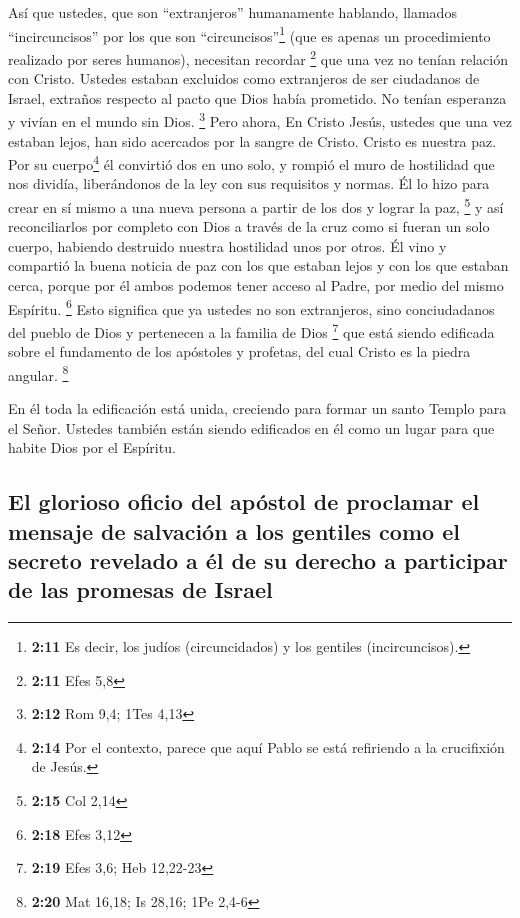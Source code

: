  Así que ustedes, que son ``extranjeros'' humanamente
hablando, llamados ``incircuncisos'' por los que son
``circuncisos''\footnote{\textbf{2:11} Es decir, los judíos
  (circuncidados) y los gentiles (incircuncisos).} (que es apenas un
procedimiento realizado por seres humanos), necesitan recordar
\footnote{\textbf{2:11} Efes 5,8}  que una vez no tenían
relación con Cristo. Ustedes estaban excluidos como extranjeros de ser
ciudadanos de Israel, extraños respecto al pacto que Dios había
prometido. No tenían esperanza y vivían en el mundo sin Dios.
\footnote{\textbf{2:12} Rom 9,4; 1Tes 4,13}  Pero ahora,
En Cristo Jesús, ustedes que una vez estaban lejos, han sido acercados
por la sangre de Cristo.  Cristo es nuestra paz. Por su
cuerpo\footnote{\textbf{2:14} Por el contexto, parece que aquí Pablo se
  está refiriendo a la crucifixión de Jesús.} él convirtió dos en uno
solo, y rompió el muro de hostilidad que nos dividía, 
liberándonos de la ley con sus requisitos y normas. Él lo hizo para
crear en sí mismo a una nueva persona a partir de los dos y lograr la
paz, \footnote{\textbf{2:15} Col 2,14}  y así
reconciliarlos por completo con Dios a través de la cruz como si fueran
un solo cuerpo, habiendo destruido nuestra hostilidad unos por otros.
 Él vino y compartió la buena noticia de paz con los que
estaban lejos y con los que estaban cerca,  porque por él
ambos podemos tener acceso al Padre, por medio del mismo Espíritu.
\footnote{\textbf{2:18} Efes 3,12}  Esto significa que ya
ustedes no son extranjeros, sino conciudadanos del pueblo de Dios y
pertenecen a la familia de Dios \footnote{\textbf{2:19} Efes 3,6; Heb
  12,22-23}  que está siendo edificada sobre el
fundamento de los apóstoles y profetas, del cual Cristo es la piedra
angular. \footnote{\textbf{2:20} Mat 16,18; Is 28,16; 1Pe 2,4-6}

 En él toda la edificación está unida, creciendo para
formar un santo Templo para el Señor.  Ustedes también
están siendo edificados en él como un lugar para que habite Dios por el
Espíritu.

\hypertarget{el-glorioso-oficio-del-apuxf3stol-de-proclamar-el-mensaje-de-salvaciuxf3n-a-los-gentiles-como-el-secreto-revelado-a-uxe9l-de-su-derecho-a-participar-de-las-promesas-de-israel}{%
\subsection{El glorioso oficio del apóstol de proclamar el mensaje de
salvación a los gentiles como el secreto revelado a él de su derecho a
participar de las promesas de
Israel}\label{el-glorioso-oficio-del-apuxf3stol-de-proclamar-el-mensaje-de-salvaciuxf3n-a-los-gentiles-como-el-secreto-revelado-a-uxe9l-de-su-derecho-a-participar-de-las-promesas-de-israel}}

